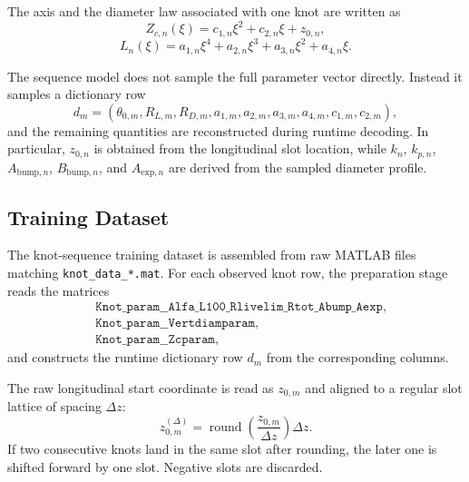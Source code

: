 \documentclass[11pt]{article}
\begin{document}
The axis and the diameter law associated with one knot are written as
\begin{equation}
Z_{c,n}(\xi) = c_{1,n}\xi^2 + c_{2,n}\xi + z_{0,n},
\end{equation}
\begin{equation}
L_n(\xi) = a_{1,n}\xi^4 + a_{2,n}\xi^3 + a_{3,n}\xi^2 + a_{4,n}\xi.
\end{equation}

The sequence model does not sample the full parameter vector directly. Instead it samples a dictionary row
\begin{equation}
d_m = \left(\theta_{0,m}, R_{L,m}, R_{D,m}, a_{1,m}, a_{2,m}, a_{3,m}, a_{4,m}, c_{1,m}, c_{2,m}\right),
\end{equation}
and the remaining quantities are reconstructed during runtime decoding. In particular, $z_{0,n}$ is obtained
from the longitudinal slot location, while $k_n$, $k_{p,n}$, $A_{\mathrm{bump},n}$, $B_{\mathrm{bump},n}$,
and $A_{\mathrm{exp},n}$ are derived from the sampled diameter profile.

\subsection{Training Dataset}

The knot-sequence training dataset is assembled from raw MATLAB files matching
\texttt{knot\_data\_*.mat}.
For each observed knot row, the preparation stage reads the matrices
\begin{align*}
&\texttt{Knot\_param\_\_Alfa\_L100\_Rlivelim\_Rtot\_Abump\_Aexp},\\
&\texttt{Knot\_param\_\_Vertdiamparam},\\
&\texttt{Knot\_param\_\_Zcparam},
\end{align*}
and constructs the runtime dictionary row $d_m$ from the corresponding columns.

The raw longitudinal start coordinate is read as $z_{0,m}$ and aligned to a regular slot lattice of spacing
$\Delta z$:
\begin{equation}
z^{(\Delta)}_{0,m} = \operatorname{round}\!\left(\frac{z_{0,m}}{\Delta z}\right)\Delta z.
\end{equation}
If two consecutive knots land in the same slot after rounding, the later one is shifted forward by one slot.
Negative slots are discarded.
\end{document}
